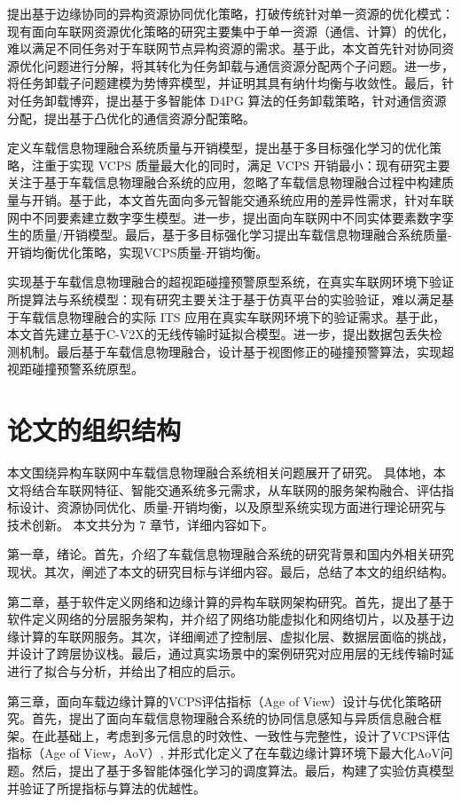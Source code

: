  提出基于边缘协同的异构资源协同优化策略，打破传统针对单一资源的优化模式：现有面向车联网资源优化策略的研究主要集中于单一资源（通信、计算）的优化，难以满足不同任务对于车联网节点异构资源的需求。基于此，本文首先针对协同资源优化问题进行分解，将其转化为任务卸载与通信资源分配两个子问题。进一步，将任务卸载子问题建模为势博弈模型，并证明其具有纳什均衡与收敛性。最后，针对任务卸载博弈，提出基于多智能体 D4PG 算法的任务卸载策略，针对通信资源分配，提出基于凸优化的通信资源分配策略。

 定义车载信息物理融合系统质量与开销模型，提出基于多目标强化学习的优化策略，注重于实现 VCPS 质量最大化的同时，满足 VCPS 开销最小：现有研究主要关注于基于车载信息物理融合系统的应用，忽略了车载信息物理融合过程中构建质量与开销。基于此，本文首先面向多元智能交通系统应用的差异性需求，针对车联网中不同要素建立数字孪生模型。进一步，提出面向车联网中不同实体要素数字孪生的质量/开销模型。最后，基于多目标强化学习提出车载信息物理融合系统质量-开销均衡优化策略，实现VCPS质量-开销均衡。

 实现基于车载信息物理融合的超视距碰撞预警原型系统，在真实车联网环境下验证所提算法与系统模型：现有研究主要关注于基于仿真平台的实验验证，难以满足基于车载信息物理融合的实际 ITS 应用在真实车联网环境下的验证需求。基于此，本文首先建立基于C-V2X的无线传输时延拟合模型。进一步，提出数据包丢失检测机制。最后基于车载信息物理融合，设计基于视图修正的碰撞预警算法，实现超视距碰撞预警系统原型。


\section{论文的组织结构}\label{section 1-7}
本文围绕异构车联网中车载信息物理融合系统相关问题展开了研究。
具体地，本文将结合车联网特征、智能交通系统多元需求，从车联网的服务架构融合、评估指标设计、资源协同优化、质量-开销均衡，以及原型系统实现方面进行理论研究与技术创新。
本文共分为 7 章节，详细内容如下。

第一章，绪论。首先，介绍了车载信息物理融合系统的研究背景和国内外相关研究现状。其次，阐述了本文的研究目标与详细内容。最后，总结了本文的组织结构。

第二章，基于软件定义网络和边缘计算的异构车联网架构研究。首先，提出了基于软件定义网络的分层服务架构，并介绍了网络功能虚拟化和网络切片，以及基于边缘计算的车联网服务。其次，详细阐述了控制层、虚拟化层、数据层面临的挑战，并设计了跨层协议栈。最后，通过真实场景中的案例研究对应用层的无线传输时延进行了拟合与分析，并给出了相应的启示。

第三章，面向车载边缘计算的VCPS评估指标（Age of View）设计与优化策略研究。首先，提出了面向车载信息物理融合系统的协同信息感知与异质信息融合框架。在此基础上，考虑到多元信息的时效性、一致性与完整性，设计了VCPS评估指标（Age of View，AoV）, 并形式化定义了在车载边缘计算环境下最大化AoV问题。然后，提出了基于多智能体强化学习的调度算法。最后，构建了实验仿真模型并验证了所提指标与算法的优越性。

